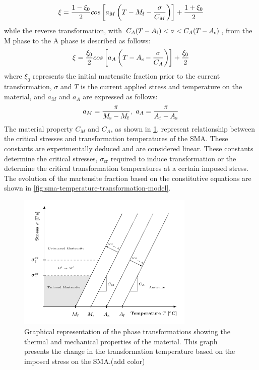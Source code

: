 \begin{equation}
  \label{eq:liang-MA}
  \xi=\frac{1-\xi_0}{2}cos\left[a_M\left(T-M_\mathrm{f}-\frac{\sigma}{C_M}\right)\right]+\frac{1+\xi_0}{2}
\end{equation}
while the reverse transformation, with $C_A(T-A_\mathrm{f})<\sigma<C_A(T-A_\mathrm{s})$, from the M phase to the A phase is described as follows:
\begin{equation}
  \label{eq:liang-AM}
  \xi=\frac{\xi_0}{2}cos\left[a_A\left(T-A_\mathrm{s}-\frac{\sigma}{C_A}\right)\right]+\frac{\xi_0}{2}
\end{equation}
where $\xi_0$ represents the initial martensite fraction prior to the current transformation, $\sigma$ and $T$ is the current applied stress and temperature on the material, and $a_M$ and $a_A$ are expressed as follows:
\begin{equation}
  \label{eq:aM-aA}
  a_M=\frac{\pi}{M_\mathrm{s}-M_\mathrm{f}},~a_A=\frac{\pi}{A_\mathrm{f}-A_\mathrm{s}}
\end{equation}
The material property $C_M$ and $C_A$, as shown in \cref{fig:phase-diagram-graph}, represent relationship between the critical stresses and transformation temperatures of the SMA. These constants are experimentally deduced and are considered linear. These constants determine the critical stresses, $\sigma_\mathrm{cr}$ required to induce transformation or the determine the critical transformation temperatures at a certain imposed stress. The evolution of the martensite fraction based on the constitutive equations are shown in \cref{fig:sma-temperature-transformation-model}.
\begin{figure}[hbt]
    \centering
    \includegraphics[width=0.75\textwidth]{images/chap2/phase-diagram-graph.pdf}
    \caption{Graphical representation of the phase transformations showing the thermal and mechanical properties of the material. This graph presents the change in the transformation temperature based on the imposed stress on the SMA.\todocite(add color)}
    \label{fig:phase-diagram-graph}
\end{figure}

